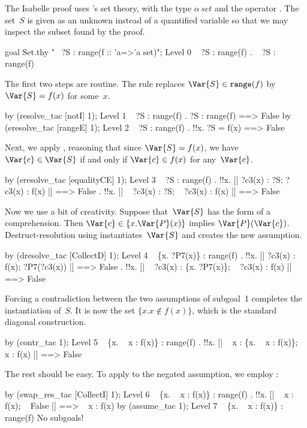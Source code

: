 The Isabelle proof uses \HOL's set theory, with the type $\alpha\,set$ and
the operator .  The set~$S$ is given as an unknown instead of a
quantified variable so that we may inspect the subset found by the proof.
\begin{ttbox}
goal Set.thy "~ ?S : range(f :: 'a=>'a set)";
{\out Level 0}
{\out ~ ?S : range(f)}
{. ~ ?S : range(f)}
\end{ttbox}
The first two steps are routine.  The rule  replaces
$\Var{S}\in {\tt range}(f)$ by $\Var{S}=f(x)$ for some~$x$.
\begin{ttbox}
by (resolve_tac [notI] 1);
{\out Level 1}
{\out ~ ?S : range(f)}
{. ?S : range(f) ==> False}
\ttbreak
by (eresolve_tac [rangeE] 1);
{\out Level 2}
{\out ~ ?S : range(f)}
{. !!x. ?S = f(x) ==> False}
\end{ttbox}
Next, we apply , reasoning that since $\Var{S}=f(x)$,
we have $\Var{c}\in \Var{S}$ if and only if $\Var{c}\in f(x)$ for
any~$\Var{c}$.
\begin{ttbox}
by (eresolve_tac [equalityCE] 1);
{\out Level 3}
{\out ~ ?S : range(f)}
{. !!x. [| ?c3(x) : ?S; ?c3(x) : f(x) |] ==> False}
{. !!x. [| ~ ?c3(x) : ?S; ~ ?c3(x) : f(x) |] ==> False}
\end{ttbox}
Now we use a bit of creativity.  Suppose that~$\Var{S}$ has the form of a
comprehension.  Then $\Var{c}\in\{x.\Var{P}(x)\}$ implies
$\Var{P}(\Var{c})$.   Destruct-resolution using 
instantiates~$\Var{S}$ and creates the new assumption.
\begin{ttbox}
by (dresolve_tac [CollectD] 1);
{\out Level 4}
{\out ~ \{x. ?P7(x)\} : range(f)}
{. !!x. [| ?c3(x) : f(x); ?P7(?c3(x)) |] ==> False}
{. !!x. [| ~ ?c3(x) : \{x. ?P7(x)\}; ~ ?c3(x) : f(x) |] ==> False}
\end{ttbox}
Forcing a contradiction between the two assumptions of subgoal~1 completes
the instantiation of~$S$.  It is now the set $\{x. x\not\in f(x)\}$, which
is the standard diagonal construction.
\begin{ttbox}
by (contr_tac 1);
{\out Level 5}
{\out ~ \{x. ~ x : f(x)\} : range(f)}
{. !!x. [| ~ x : \{x. ~ x : f(x)\}; ~ x : f(x) |] ==> False}
\end{ttbox}
The rest should be easy.  To apply  to the negated
assumption, we employ :
\begin{ttbox}
by (swap_res_tac [CollectI] 1);
{\out Level 6}
{\out ~ \{x. ~ x : f(x)\} : range(f)}
{. !!x. [| ~ x : f(x); ~ False |] ==> ~ x : f(x)}
\ttbreak
by (assume_tac 1);
{\out Level 7}
{\out ~ \{x. ~ x : f(x)\} : range(f)}
{\out No subgoals!}
\end{ttbox}
